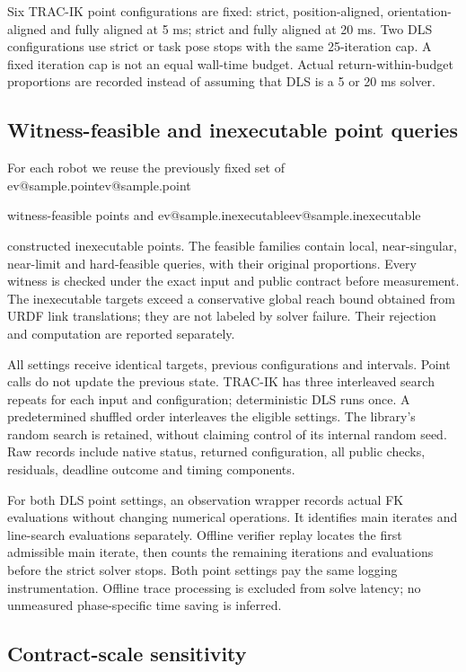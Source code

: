 \documentclass[10pt,a4paper]{article}
\makeatletter
\newcommand{\ev}[1]{\ifcsname ev@#1\endcsname\csname ev@#1\endcsname\else\PackageError{evidence}{Undefined evidence key #1}{}\fi}
\makeatother
\begin{document}
Six TRAC-IK point configurations are fixed: strict, position-aligned,
orientation-aligned and fully aligned at 5 ms; strict and fully aligned at
20 ms. Two DLS configurations use strict or task pose stops with the same
25-iteration cap. A fixed iteration cap is not an equal wall-time budget.
Actual return-within-budget proportions are recorded instead of assuming
that DLS is a 5 or 20 ms solver.

\subsection{Witness-feasible and inexecutable point queries}

For each robot we reuse the previously fixed set of \ev{sample.point}
witness-feasible points and \ev{sample.inexecutable} constructed inexecutable
points. The feasible families contain local, near-singular, near-limit and
hard-feasible queries, with their original proportions.
Every witness is checked under the exact input and public contract before
measurement. The inexecutable targets exceed a conservative global reach
bound obtained from URDF link translations; they are not labeled by solver
failure. Their rejection and computation are reported separately.

All settings receive identical targets, previous configurations and intervals.
Point calls do not update the previous state. TRAC-IK has three interleaved
search repeats for each input and configuration; deterministic DLS runs once.
A predetermined shuffled order interleaves the eligible settings.
The library's random search is retained, without claiming control of its
internal random seed. Raw records include native status, returned configuration,
all public checks, residuals, deadline outcome and timing components.

For both DLS point settings, an observation wrapper records actual FK evaluations
without changing numerical operations. It identifies main iterates and
line-search evaluations separately. Offline verifier replay locates the first
admissible main iterate, then counts the remaining iterations and evaluations
before the strict solver stops. Both point settings pay the same logging
instrumentation. Offline trace processing is excluded from solve latency;
no unmeasured phase-specific time saving is inferred.

\subsection{Contract-scale sensitivity}
\end{document}
